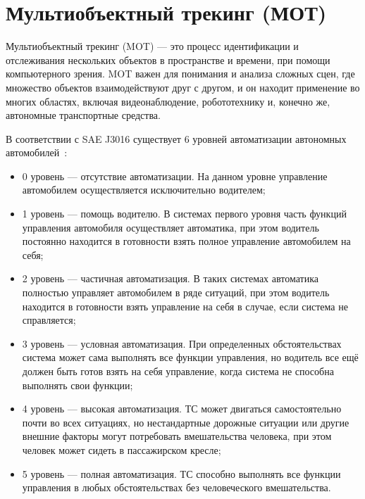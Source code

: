 \chapter{Мультиобъектный трекинг (МОТ)}

Мультиобъектный трекинг (MOT) — это процесс идентификации и отслеживания нескольких объектов в пространстве и времени, при помощи компьютерного зрения. MOT важен для понимания и анализа сложных сцен, где множество объектов взаимодействуют друг с другом, и он находит применение во многих областях, включая видеонаблюдение, робототехнику и, конечно же, автономные транспортные средства.

В соответствии с SAE J3016 существует 6 уровней автоматизации автономных автомобилей~\cite{Steckhan2022}:

\begin{itemize}

	\item 	0 уровень --- отсутствие автоматизации. На данном уровне управление автомобилем осуществляется исключительно водителем;

	\item 	1 уровень --- помощь водителю. В системах первого уровня часть функций управления автомобиля осуществляет автоматика, при этом водитель постоянно находится в готовности взять полное управление автомобилем на себя;
	
	\item	2 уровень --- частичная автоматизация. В таких системах автоматика полностью управляет автомобилем в ряде ситуаций, при этом водитель находится в готовности взять управление на себя в случае, если система не справляется;
	
	\item	3 уровень --- условная автоматизация. При определенных обстоятельствах система может сама выполнять все функции управления, но водитель все ещё должен быть готов взять на себя управление, когда система не способна выполнять свои функции;
	
	\item 	4 уровень --- высокая автоматизация. ТС может двигаться самостоятельно почти во всех ситуациях, но нестандартные дорожные ситуации или другие внешние факторы могут потребовать вмешательства человека, при этом человек может сидеть в пассажирском кресле;
	
	\item 	5 уровень --- полная автоматизация. ТС способно выполнять все функции управления в любых обстоятельствах без человеческого вмешательства.

\end{itemize}

